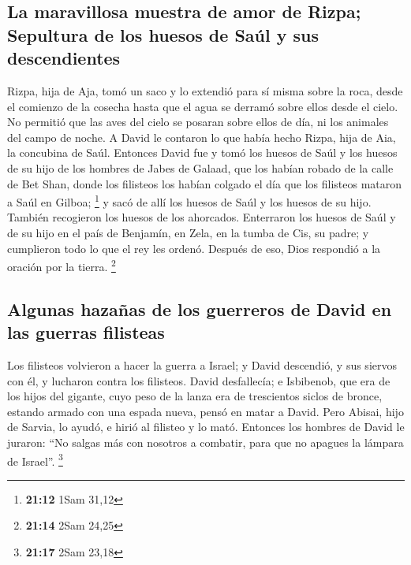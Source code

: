 \begin{paracol}{2}
\hypertarget{la-maravillosa-muestra-de-amor-de-rizpa-sepultura-de-los-huesos-de-sauxfal-y-sus-descendientes}{%
\subsection{La maravillosa muestra de amor de Rizpa; Sepultura de los
huesos de Saúl y sus
descendientes}\label{la-maravillosa-muestra-de-amor-de-rizpa-sepultura-de-los-huesos-de-sauxfal-y-sus-descendientes}}

 Rizpa, hija de Aja, tomó un saco y lo extendió para sí
misma sobre la roca, desde el comienzo de la cosecha hasta que el agua
se derramó sobre ellos desde el cielo. No permitió que las aves del
cielo se posaran sobre ellos de día, ni los animales del campo de noche.
 A David le contaron lo que había hecho Rizpa, hija de
Aia, la concubina de Saúl.  Entonces David fue y tomó los
huesos de Saúl y los huesos de su hijo de los hombres de Jabes de
Galaad, que los habían robado de la calle de Bet Shan, donde los
filisteos los habían colgado el día que los filisteos mataron a Saúl en
Gilboa; \footnote{\textbf{21:12} 1Sam 31,12}  y sacó de
allí los huesos de Saúl y los huesos de su hijo. También recogieron los
huesos de los ahorcados.  Enterraron los huesos de Saúl y
de su hijo en el país de Benjamín, en Zela, en la tumba de Cis, su
padre; y cumplieron todo lo que el rey les ordenó. Después de eso, Dios
respondió a la oración por la tierra. \footnote{\textbf{21:14} 2Sam
  24,25}

\hypertarget{algunas-hazauxf1as-de-los-guerreros-de-david-en-las-guerras-filisteas}{%
\subsection{Algunas hazañas de los guerreros de David en las guerras
filisteas}\label{algunas-hazauxf1as-de-los-guerreros-de-david-en-las-guerras-filisteas}}

 Los filisteos volvieron a hacer la guerra a Israel; y
David descendió, y sus siervos con él, y lucharon contra los filisteos.
David desfallecía;  e Isbibenob, que era de los hijos del
gigante, cuyo peso de la lanza era de trescientos siclos de bronce,
estando armado con una espada nueva, pensó en matar a David.
 Pero Abisai, hijo de Sarvia, lo ayudó, e hirió al
filisteo y lo mató. Entonces los hombres de David le juraron: ``No
salgas más con nosotros a combatir, para que no apagues la lámpara de
Israel''. \footnote{\textbf{21:17} 2Sam 23,18}


\end{paracol}
